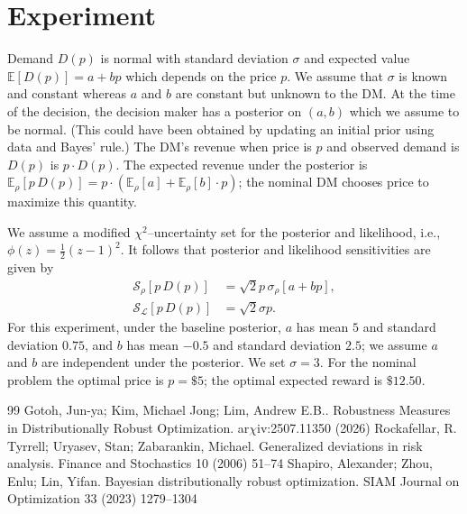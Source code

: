 \documentclass[10pt,a4paper]{amsart}
\numberwithin{equation}{section}
\numberwithin{theorem}{section}
\numberwithin{table}{section}
\numberwithin{figure}{section}
\begin{document}
\section{Experiment}
\label{sec:experiments}


Demand $D(p)$ is normal with standard deviation $\sigma$ and expected value ${\mathbb E}[D(p)] = a + b p$ which depends on the price $p$. We assume that $\sigma$ is known and constant whereas $a$ and $b$ are constant but unknown to the DM. At the time of the decision, the decision maker has a posterior on $(a, b)$ which we assume to be normal. (This could have been obtained by updating an initial prior using data and Bayes' rule.) The DM's revenue when price is $p$ and observed demand is $D(p)$ is $p\cdot D(p)$. The expected revenue under the posterior is ${\mathbb E}_\rho [p \, D(p)] = p \cdot ({\mathbb E}_\rho[a]  + {\mathbb E}_\rho[b]\cdot p)$; the nominal DM chooses price to maximize this quantity. 

We assume a modified $\chi^2$--uncertainty set for the posterior and likelihood, i.e., $\phi(z) = \frac{1}{2}(z-1)^2$. It follows that posterior and likelihood sensitivities are given by
\begin{align}
\label{eq:pricing-senitivities}
{\mathcal S}_\rho[p\, D(p)] & = \sqrt{2} p \, \sigma_\rho [a + b p], \\
{\mathcal S}_{\mathcal L}[p\, D(p)] & = \sqrt{2}\sigma p. \nonumber
\end{align}
For this experiment, under the baseline posterior, $a$ has mean $5$ and standard deviation $0.75$, and $b$ has mean $-0.5$ and standard deviation $2.5$; we assume $a$ and $b$ are independent under the posterior. We set $\sigma = 3$.  For the nominal problem the optimal price is $p =\$5$; the optimal expected reward is $\$12.50$.


\begin{thebibliography}{99}
 Gotoh, Jun-ya; Kim, Michael Jong; Lim, Andrew E.B.. Robustness Measures in Distributionally Robust Optimization. ar$\chi$iv:2507.11350 (2026)
 Rockafellar, R. Tyrrell; Uryasev, Stan; Zabarankin, Michael. Generalized deviations in risk analysis. Finance and Stochastics 10 (2006) 51--74
 Shapiro, Alexander; Zhou, Enlu; Lin, Yifan. Bayesian distributionally robust optimization. SIAM Journal on Optimization 33 (2023) 1279--1304
\end{thebibliography}
\end{document}
